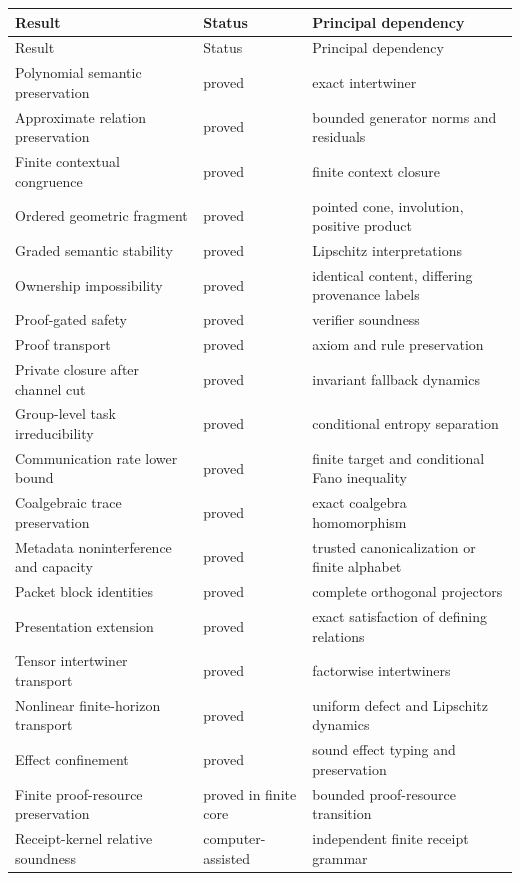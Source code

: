 \documentclass[11pt]{article}
\theoremstyle{definition}
\theoremstyle{remark}
\begin{document}
\begin{longtable}{p{}p{}p{}}
\toprule
Result & Status & Principal dependency \\
\midrule
\endfirsthead
\toprule
Result & Status & Principal dependency \\
\midrule
\endhead
Polynomial semantic preservation & proved & exact intertwiner \\
Approximate relation preservation & proved & bounded generator norms and residuals \\
Finite contextual congruence & proved & finite context closure \\
Ordered geometric fragment & proved & pointed cone, involution, positive product \\
Graded semantic stability & proved & Lipschitz interpretations \\
Ownership impossibility & proved & identical content, differing provenance labels \\
Proof-gated safety & proved & verifier soundness \\
Proof transport & proved & axiom and rule preservation \\
Private closure after channel cut & proved & invariant fallback dynamics \\
Group-level task irreducibility & proved & conditional entropy separation \\
Communication rate lower bound & proved & finite target and conditional Fano inequality \\
Coalgebraic trace preservation & proved & exact coalgebra homomorphism \\
Metadata noninterference and capacity & proved & trusted canonicalization or finite alphabet \\
Packet block identities & proved & complete orthogonal projectors \\
Presentation extension & proved & exact satisfaction of defining relations \\
Tensor intertwiner transport & proved & factorwise intertwiners \\
Nonlinear finite-horizon transport & proved & uniform defect and Lipschitz dynamics \\
Effect confinement & proved & sound effect typing and preservation \\
Finite proof-resource preservation & proved in finite core & bounded proof-resource transition \\
Receipt-kernel relative soundness & computer-assisted & independent finite receipt grammar \\

\end{longtable}
\end{document}
